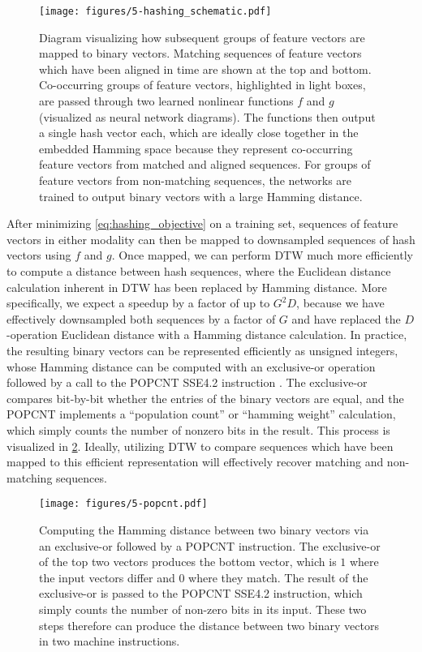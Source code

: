 \begin{figure}
  \texttt{[image: figures/5-hashing\_schematic.pdf]}
  \caption[Hashing groups of subsequent feature vectors]{Diagram visualizing how subsequent groups of feature vectors are mapped to binary vectors.
Matching sequences of feature vectors which have been aligned in time are shown at the top and bottom.
Co-occurring groups of feature vectors, highlighted in light boxes, are passed through two learned nonlinear functions $f$ and $g$ (visualized as neural network diagrams).
The functions then output a single hash vector each, which are ideally close together in the embedded Hamming space because they represent co-occurring feature vectors from matched and aligned sequences.
For groups of feature vectors from non-matching sequences, the networks are trained to output binary vectors with a large Hamming distance.}
  \label{fig:hashing_schematic}
\end{figure}

After minimizing \cref{eq:hashing_objective} on a training set, sequences of feature vectors in either modality can then be mapped to downsampled sequences of hash vectors using $f$ and $g$.
Once mapped, we can perform DTW much more efficiently to compute a distance between hash sequences, where the Euclidean distance calculation inherent in DTW has been replaced by Hamming distance.
More specifically, we expect a speedup by a factor of up to $G^2 D$, because we have effectively downsampled both sequences by a factor of $G$ and have replaced the $D$-operation Euclidean distance with a Hamming distance calculation.
In practice, the resulting binary vectors can be represented efficiently as unsigned integers, whose Hamming distance can be computed with an exclusive-or operation followed by a call to the POPCNT SSE4.2 instruction \cite{intel2007programming}.
The exclusive-or compares bit-by-bit whether the entries of the binary vectors are equal, and the POPCNT implements a ``population count'' or ``hamming weight'' calculation, which simply counts the number of nonzero bits in the result.
This process is visualized in \cref{fig:popcnt}.
Ideally, utilizing DTW to compare sequences which have been mapped to this efficient representation will effectively recover matching and non-matching sequences.

\begin{figure}
  \texttt{[image: figures/5-popcnt.pdf]}
  \caption[Computing Hamming distance with XOR and POPCNT]{Computing the Hamming distance between two binary vectors via an exclusive-or followed by a POPCNT instruction.
The exclusive-or of the top two vectors produces the bottom vector, which is $1$ where the input vectors differ and $0$ where they match.
The result of the exclusive-or is passed to the POPCNT SSE4.2 instruction, which simply counts the number of non-zero bits in its input.
These two steps therefore can produce the distance between two binary vectors in two machine instructions.}
  \label{fig:popcnt}
\end{figure}

